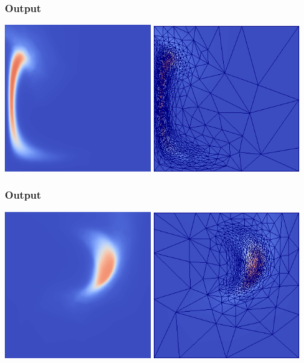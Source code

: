 \documentclass[12pt]{beamer}
\begin{document}
\begin{frame}
    \frametitle{Output}
\includegraphics[width=0.48\textwidth]{images/stommel_10.png}
\hspace{1mm}
\includegraphics[width=0.48\textwidth]{images/stommel_10_mesh.png}
\end{frame}
\begin{frame}
    \frametitle{Output}
\includegraphics[width=0.48\textwidth]{images/stommel_20.png}
\hspace{1mm}
\includegraphics[width=0.48\textwidth]{images/stommel_20_mesh.png}
\end{frame}
\end{document}
